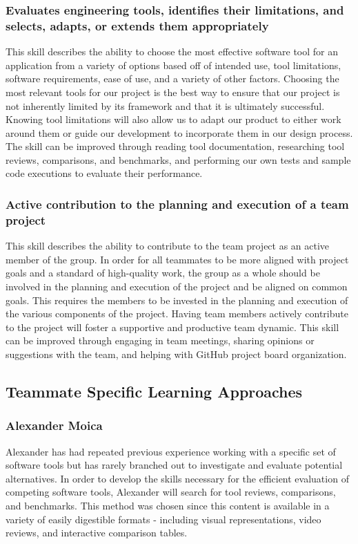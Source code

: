 \documentclass[12pt]{article}
\begin{document}
\subsubsection{Evaluates engineering tools, identifies their limitations, and selects, adapts, or extends them appropriately}
This skill describes the ability to choose the most effective software tool for an application from a variety of options based off of intended use, tool limitations, software requirements, ease of use, and a variety of other factors. Choosing the most relevant tools for our project is the best way to ensure that our project is not inherently limited by its framework and that it is ultimately successful. Knowing tool limitations will also allow us to adapt our product to either work around them or guide our development to incorporate them in our design process. The skill can be improved through reading tool documentation, researching tool reviews, comparisons, and benchmarks, and performing our own tests and sample code executions to evaluate their performance. 

\subsubsection{Active contribution to the planning and execution of a team project}
This skill describes the ability to contribute to the team project as an active member of the group. In order for all teammates to be more aligned with project goals and a standard of high-quality work, the group as a whole should be involved in the planning and execution of the project and be aligned on common goals. This requires the members to be invested in the planning and execution of the various components of the project. Having team members actively contribute to the project will foster a supportive and productive team dynamic. This skill can be improved through engaging in team meetings, sharing opinions or suggestions with the team, and helping with GitHub project board organization.

\subsection{Teammate Specific Learning Approaches}
\subsubsection{Alexander Moica}
Alexander has had repeated previous experience working with a specific set of software tools but has rarely branched out to investigate and evaluate potential alternatives. In order to develop the skills necessary for the efficient evaluation of competing software tools, Alexander will search for tool reviews, comparisons, and benchmarks. This method was chosen since this content is available in a variety of easily digestible formats - including visual representations, video reviews, and interactive comparison tables.
\end{document}
